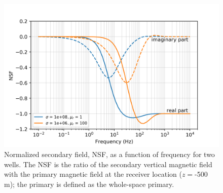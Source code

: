 \begin{figure}[htb]
    \begin{center}
    \includegraphics[width=0.6\columnwidth]{figures/casing_software/fdemNSF.png}
    \end{center}
\caption{
    Normalized secondary field, NSF, as a function of frequency for two wells.
    The NSF is the ratio of the secondary vertical magnetic field with the primary magnetic field at the receiver location ($z=$-500 m);
    the primary is defined as the whole-space primary.
}
\label{fig:fdemNSF}
\end{figure}
